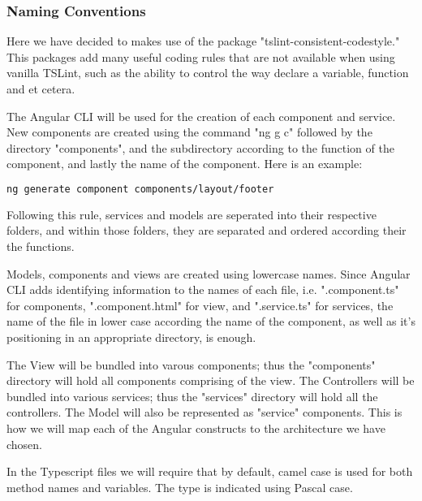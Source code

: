 \documentclass[11pt]{article}
\begin{document}
\subsubsection{Naming Conventions}

Here we have decided to makes use of the package "tslint-consistent-codestyle." This packages add many useful coding rules that are not available when using vanilla TSLint, such as the ability to control the way declare a variable, function and et cetera.\cite{Website:4}

The Angular CLI will be used for the creation of each component and service. New components are created using the command "ng g c" followed by the directory "components", and the subdirectory according to the function of the component, and lastly the name of the component. Here is an example:

\begin{lstlisting}[language=bash]
ng generate component components/layout/footer
\end{lstlisting}
Following this rule, services and models are seperated into their respective folders, and within those folders, they are separated and ordered according their the functions.\par
Models, components and views are created using lowercase names. Since Angular CLI adds identifying information to the names of each file, i.e. ".component.ts" for components, ".component.html" for view, and ".service.ts" for services, the name of the file in lower case according the name of the component, as well as it's positioning in an appropriate directory, is enough.\par

The View will be bundled into varous components; thus the "components" directory will hold all components comprising of the view. The Controllers will be bundled into various services; thus the "services" directory will hold all the controllers. The Model will also be represented as "service" components. This is how we will map each of the Angular constructs to the architecture we have chosen.


In the Typescript files we will require that by default, camel case is used for both method names and variables. The type is indicated using Pascal case.

\end{document}
